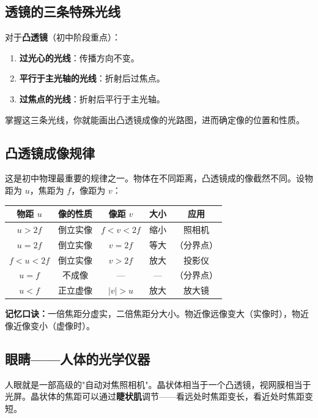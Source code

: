 \documentclass[a4paper,12pt]{ctexart}
\begin{document}
\subsection*{透镜的三条特殊光线}

对于\textbf{凸透镜}（初中阶段重点）：
\begin{enumerate}
  \item \textbf{过光心的光线}：传播方向不变。
  \item \textbf{平行于主光轴的光线}：折射后过焦点。
  \item \textbf{过焦点的光线}：折射后平行于主光轴。
\end{enumerate}

掌握这三条光线，你就能画出凸透镜成像的光路图，进而确定像的位置和性质。

\subsection*{凸透镜成像规律}

这是初中物理最重要的规律之一。物体在不同距离，凸透镜成的像截然不同。设物距为 $u$，焦距为 $f$，像距为 $v$：

\begin{center}
\begin{tabular}{|c|c|c|c|c|}
\hline
\textbf{物距 $u$} & \textbf{像的性质} & \textbf{像距 $v$} & \textbf{大小} & \textbf{应用} \\
\hline
$u > 2f$ & 倒立实像 & $f < v < 2f$ & 缩小 & 照相机 \\
$u = 2f$ & 倒立实像 & $v = 2f$ & 等大 & （分界点）\\
$f < u < 2f$ & 倒立实像 & $v > 2f$ & 放大 & 投影仪 \\
$u = f$ & 不成像 & — & — & （分界点）\\
$u < f$ & 正立虚像 & $|v| > u$ & 放大 & 放大镜 \\
\hline
\end{tabular}
\end{center}

\textbf{记忆口诀：}一倍焦距分虚实，二倍焦距分大小。物近像远像变大（实像时），物近像近像变小（虚像时）。

\subsection*{眼睛——人体的光学仪器}

人眼就是一部高级的"自动对焦照相机"。晶状体相当于一个凸透镜，视网膜相当于光屏。晶状体的焦距可以通过\textbf{睫状肌}调节——看远处时焦距变长，看近处时焦距变短。
\end{document}
